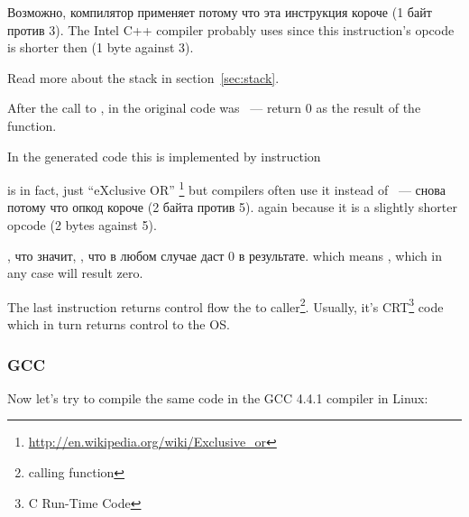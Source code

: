 \IFRU
{Возможно, компилятор применяет  потому что эта инструкция короче (1 байт против 3).}
{The Intel C++ compiler probably uses  since this instruction's opcode is shorter then 
 (1 byte against 3).}

{Read more about the stack in section}~\ref{sec:stack}.

{After the call to \printf, in the original \CCpp code was  ~--- 
return $0$ as the result of the \main function.}

{In the generated code this is implemented by instruction}  

{\XOR is in fact, just ``eXclusive OR''}
\footnote{\url{http://en.wikipedia.org/wiki/Exclusive_or}}
{but compilers often use it instead of}
 ~--- 
\IFRU
{снова потому что опкод короче (2 байта против 5).}
{again because it is a slightly shorter opcode (2 bytes against 5).}

, 
\IFRU
{что значит, , что в любом случае даст 0 в результате.}
{which means , which in any case will result zero.}

{The last instruction \RET returns control flow the to caller\footnote{calling function}.
Usually, it's \CCpp CRT\footnote{C Run-Time Code} code which in turn
returns control to the \ac{OS}.}

\subsubsection{GCC}

{Now let's try to compile the same \CCpp code in the GCC 4.4.1 compiler in Linux}: 

